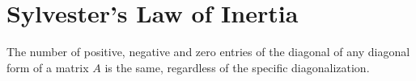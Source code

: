 \section*{Sylvester's Law of Inertia}

The number of positive, negative and zero entries of the diagonal of any diagonal form of a matrix $A$ is the same, regardless of the specific diagonalization.